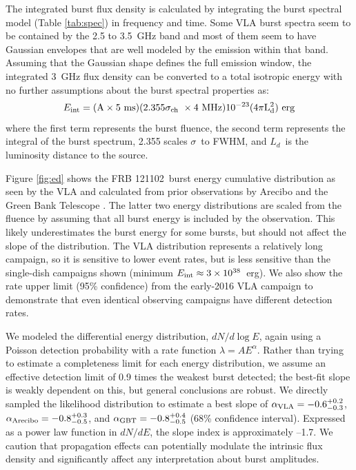 \documentclass[twocolumn]{aastex61}
\newcommand{\frb}{FRB 121102}
\begin{document}
The integrated burst flux density is calculated by integrating the burst spectral model (Table \ref{tab:spec}) in frequency and time. Some VLA burst spectra seem to be contained by the 2.5 to 3.5~GHz band and most of them seem to have Gaussian envelopes that are well modeled by the emission within that band. Assuming that the Gaussian shape defines the full emission window, the integrated 3~GHz flux density can be converted to a total isotropic energy with no further assumptions about the burst spectral properties as:
\begin{equation}
E_{\rm{int}} = (\rm{A} \times 5\ \rm{ms}) ( 2.355 \sigma_{ch}\ \times 4\ \rm{MHz}) 10^{-23} (4\pi L_d^2)\ \rm{erg}
\end{equation}
\noindent where the first term represents the burst fluence, the second term represents the integral of the burst spectrum, 2.355 scales $\sigma$\ to FWHM, and $L_d$\ is the luminosity distance to the source.

Figure \ref{fig:ed} shows the \frb\ burst energy cumulative distribution as seen by the VLA and calculated from prior observations by Arecibo and the Green Bank Telescope \citep{2016Natur.531..202S, 2016arXiv160308880S}. The latter two energy distributions are scaled from the fluence by assuming that all burst energy is included by the observation. This likely underestimates the burst energy for some bursts, but should not affect the slope of the distribution. The VLA distribution represents a relatively long campaign, so it is sensitive to lower event rates, but is less sensitive than the single-dish campaigns shown (minimum $E_{\rm{int}}\approx3\times10^{38}$\ erg). We also show the rate upper limit (95\% confidence) from the early-2016 VLA campaign to demonstrate that even identical observing campaigns have different detection rates.

We modeled the differential energy distribution, $dN/d\log{E}$, again using a Poisson detection probability with a rate function $\lambda = A E^{\alpha}$. Rather than trying to estimate a completeness limit for each energy distribution, we assume an effective detection limit of 0.9 times the weakest burst detected; the best-fit slope is weakly dependent on this, but general conclusions are robust. We directly sampled the likelihood distribution to estimate a best slope of $\alpha_{\rm{VLA}}=-0.6^{+0.2}_{-0.3}$, $\alpha_{\rm{Arecibo}}=-0.8^{+0.3}_{-0.5}$, and $\alpha_{\rm{GBT}}=-0.8^{+0.4}_{-0.5}$ (68\% confidence interval). Expressed as a power law function in $dN/dE$, the slope index is approximately --1.7. We caution that propagation effects can potentially modulate the intrinsic flux density and significantly affect any interpretation about burst amplitudes. 
\end{document}

